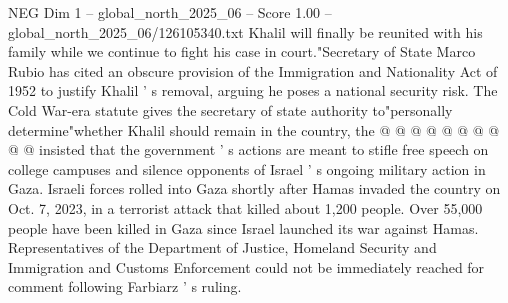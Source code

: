 \begin{textsample}{NEG Dim 1 – global\_north\_2025\_06 – Score 1.00 – global\_north\_2025\_06/126105340.txt}
Khalil will finally be reunited with his family while we continue to fight his case in court."Secretary of State Marco Rubio has cited an obscure provision of the Immigration and Nationality Act of 1952 to justify Khalil ' s removal, arguing he poses a national security risk.
The Cold War-era statute gives the secretary of state authority to"personally determine"whether Khalil should remain in the country, the @ @ @ @ @ @ @ @ @ @ insisted that the government ' s actions are meant to stifle free speech on college campuses and silence opponents of Israel ' s ongoing military action in Gaza.
Israeli forces rolled into Gaza shortly after Hamas invaded the country on Oct. 7, 2023, in a terrorist attack that killed about 1,200 people.
Over 55,000 people have been killed in Gaza since Israel launched its war against Hamas.
Representatives of the Department of Justice, Homeland Security and Immigration and Customs Enforcement could not be immediately reached for comment following Farbiarz ' s ruling.

\end{textsample}
